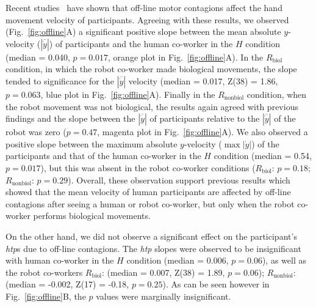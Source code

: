 \documentclass[a4paper, 12pt, oneside]{Thesis}  %
\begin{document}
Recent studies~\cite{Noy:B&C:2009, Kilner:SocialNeuro:2007} have shown that off-line motor contagions affect the hand movement velocity of participants. Agreeing with these results, we observed (Fig.~\ref{fig:offline}A) a significant positive slope between the mean absolute $y$-velocity ($|\overline{\dot{y}}|$) of participants and the human co-worker in the $H$ condition (median = 0.040, $p = 0.017$, orange plot in Fig.~\ref{fig:offline}A). In the $R_{\text{biol}}$ condition, in which the robot co-worker made biological movements, the slope tended to significance for the $|\overline{\dot{y}}|$ velocity (median = 0.017, Z(38) = 1.86, $p = 0.063$, blue plot in Fig.~\ref{fig:offline}A). Finally in the $R_{\text{nonbiol}}$ condition, when the robot movement was not biological, the results again agreed with previous findings and the slope between the $|\overline{\dot{y}}|$ of participants relative to the $|\overline{\dot{y}}|$ of the robot was zero ($p = 0.47$, magenta plot in Fig.~\ref{fig:offline}A). We also observed a positive slope between the maximum absolute $y$-velocity ($\max |\dot{y}|$) of the participants and that of the human co-worker in the $H$ condition (median = 0.54, $p = 0.017$), but this was absent in the robot co-worker conditions ($R_{\text{biol}}$: $p = 0.18$; $R_{\text{nonbiol}}$: $p = 0.29$). Overall, these observation support previous results which showed that the mean velocity of human participants are affected by off-line contagions after seeing a human or robot co-worker, but only when the robot co-worker performs biological movements.

On the other hand, we did not observe a significant effect on the participant's {\it htp}s due to off-line contagions. The {\it htp} slopes were observed to be insignificant with human co-worker in the $H$ condition (median = 0.006, $p = 0.06$), as well as the robot co-workers $R_{\text{biol}}$: (median = 0.007, Z(38) = 1.89, $p = 0.06$); $R_{\text{nonbiol}}$: (median = -0.002, Z(17) = -0.18, $p = 0.25$). As can be seen however in Fig.~\ref{fig:offline}B, the $p$ values were marginally insignificant.
\end{document}
